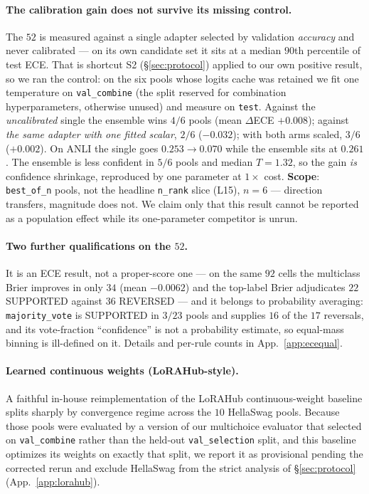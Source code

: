 \documentclass[11pt]{article}
\begin{document}
\paragraph{The calibration gain does not survive its missing control.} The $52$ is measured against a single adapter selected by validation \emph{accuracy} and never calibrated --- on its own candidate set it sits at a median $90$th percentile of test ECE. That is shortcut S2 (\S\ref{sec:protocol}) applied to our own positive result, so we ran the control: on the six pools whose logits cache was retained we fit one temperature on \texttt{val\_combine} (the split reserved for combination hyperparameters, otherwise unused) and measure on \texttt{test}. Against the \emph{uncalibrated} single the ensemble wins $4/6$ pools (mean $\Delta$ECE ${+}0.008$); against \emph{the same adapter with one fitted scalar}, $2/6$ (${-}0.032$); with both arms scaled, $3/6$ (${+}0.002$). On ANLI the single goes $0.253{\to}0.070$ while the ensemble sits at $0.261$. The ensemble is less confident in $5/6$ pools and median $T{=}1.32$, so the gain \emph{is} confidence shrinkage, reproduced by one parameter at $1\times$ cost. \textbf{Scope}: \texttt{best\_of\_n} pools, not the headline \texttt{n\_rank} slice (L15), $n{=}6$ --- direction transfers, magnitude does not. We claim only that this result cannot be reported as a population effect while its one-parameter competitor is unrun.

\paragraph{Two further qualifications on the $52$.} It is an ECE result, not a proper-score one --- on the same $92$ cells the multiclass Brier improves in only $34$ (mean ${-}0.0062$) and the top-label Brier adjudicates $22$ SUPPORTED against $36$ REVERSED --- and it belongs to probability averaging: \texttt{majority\_vote} is SUPPORTED in $3/23$ pools and supplies $16$ of the $17$ reversals, and its vote-fraction ``confidence'' is not a probability estimate, so equal-mass binning is ill-defined on it. Details and per-rule counts in App.~\ref{app:ecequal}.

\paragraph{Learned continuous weights (LoRAHub-style).} A faithful in-house reimplementation of the LoRAHub \citep{huang2023lorahub} continuous-weight baseline splits sharply by convergence regime across the $10$ HellaSwag pools. Because those pools were evaluated by a version of our multichoice evaluator that selected on \texttt{val\_combine} rather than the held-out \texttt{val\_selection} split, and this baseline optimizes its weights on exactly that split, we report it as provisional pending the corrected rerun and exclude HellaSwag from the strict analysis of \S\ref{sec:protocol} (App.~\ref{app:lorahub}).
\end{document}
